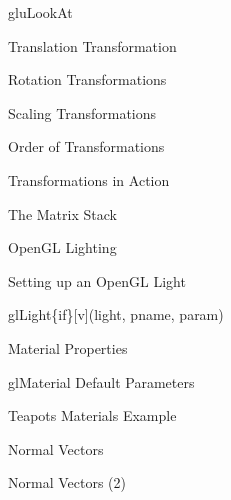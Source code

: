 \documentclass[xcolor=dvipsnames,t]{beamer}
\newcommand{\showcode}[1]{\begin{mdframed}[style=code] %
                          \end{mdframed}%
}
\begin{document}
\begin{frame}{gluLookAt}
\end{frame} 

\begin{frame}{Translation Transformation}
\end{frame} 

\begin{frame}{Rotation Transformations} 
\end{frame} 

\begin{frame}{Scaling Transformations} 
\end{frame} 

\begin{frame}{Order of Transformations}
\end{frame} 

\begin{frame}{Transformations in Action}
\end{frame} 

\begin{frame}{The Matrix Stack} 
\end{frame} 

\begin{frame}{OpenGL Lighting} 
\end{frame} 

\begin{frame}{Setting up an OpenGL Light}
    \showcode{light.c} 
\end{frame} 

\begin{frame}{glLight\{if\}[v](light, pname, param)}
\end{frame} 

\begin{frame}{Material Properties} 
\end{frame} 

\begin{frame}{glMaterial Default Parameters} 
\end{frame} 

\begin{frame}{Teapots Materials Example} 
\end{frame} 

\begin{frame}{Normal Vectors} 
\end{frame} 

\begin{frame}{Normal Vectors (2)}
\end{frame} 
\end{document}
